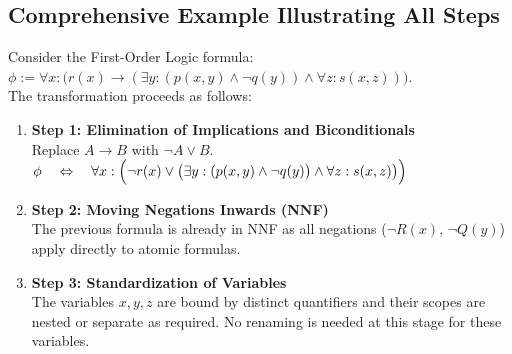 \subsection{Comprehensive Example Illustrating All Steps}
Consider the First-Order Logic formula:
\\[0.2cm]
\hspace*{1.3cm}
$\phi := \forall x: \bigl(r(x) \rightarrow (\exists y: (p(x,y) \land \neg q(y)) \land \forall z: s(x,z)))$.
\\[0.2cm]
The transformation proceeds as follows:
\begin{enumerate}
\item \textbf{Step 1: Elimination of Implications and Biconditionals} \\
      Replace $A \rightarrow B$ with $\neg A \lor B$. 
      \\[0.2cm]
      \hspace*{1.3cm}
      $\phi \quad\Leftrightarrow\quad \forall x: \Bigl(\neg r(x) \lor \bigl(\exists y: (p(x,y) \land \neg
      q(y)\bigr) \land \forall z: s(x,z)\bigr)\Bigr)$ 
\item \textbf{Step 2: Moving Negations Inwards (NNF)} \\
      The previous formula is already in NNF as all negations ($\neg R(x)$, $\neg Q(y)$) apply directly to atomic formulas.

\item \textbf{Step 3: Standardization of Variables} \\
    The variables $x, y, z$ are bound by distinct quantifiers and their scopes are nested or separate as required. No renaming is needed at this stage for these variables.


\end{enumerate}
